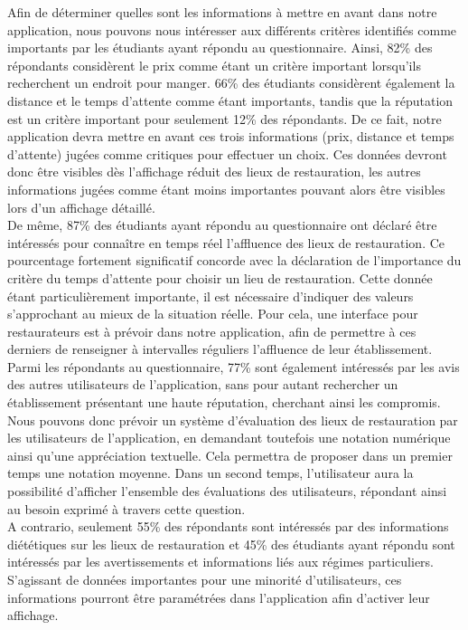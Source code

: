 Afin de déterminer quelles sont les informations à mettre en avant dans notre application, nous pouvons nous intéresser aux différents critères identifiés comme importants par les étudiants ayant répondu au questionnaire. Ainsi, 82\% des répondants considèrent le prix comme étant un critère important lorsqu'ils recherchent un endroit pour manger. 66\% des étudiants considèrent également la distance et le temps d'attente comme étant importants, tandis que la réputation est un critère important pour seulement 12\% des répondants. De ce fait, notre application devra mettre en avant ces trois informations (prix, distance et temps d'attente) jugées comme critiques pour effectuer un choix. Ces données devront donc être visibles dès l'affichage réduit des lieux de restauration, les autres informations jugées comme étant moins importantes pouvant alors être visibles lors d’un affichage détaillé. \\

De même, 87\% des étudiants ayant répondu au questionnaire ont déclaré être intéressés pour connaître en temps réel l'affluence des lieux de restauration. Ce pourcentage fortement significatif concorde avec la déclaration de l'importance du critère du temps d'attente pour choisir un lieu de restauration. Cette donnée étant particulièrement importante, il est nécessaire d'indiquer des valeurs s'approchant au mieux de la situation réelle. Pour cela, une interface pour restaurateurs est à prévoir dans notre application, afin de permettre à ces derniers de renseigner à intervalles réguliers l’affluence de leur établissement. \\

Parmi les répondants au questionnaire, 77\% sont également intéressés par les avis des autres utilisateurs de l'application, sans pour autant rechercher un établissement présentant une haute réputation, cherchant ainsi les compromis. Nous pouvons donc prévoir un système d’évaluation des lieux de restauration par les utilisateurs de l'application, en demandant toutefois une notation numérique ainsi qu’une appréciation textuelle. Cela permettra de proposer dans un premier temps une notation moyenne. Dans un second temps, l'utilisateur aura la possibilité d'afficher l’ensemble des évaluations des utilisateurs, répondant ainsi au besoin exprimé à travers cette question. \\

A contrario, seulement 55\% des répondants sont intéressés par des informations diététiques sur les lieux de restauration et 45\% des étudiants ayant répondu sont intéressés par les avertissements et informations liés aux régimes particuliers. S'agissant de données importantes pour une minorité d'utilisateurs, ces informations pourront être paramétrées dans l'application afin d'activer leur affichage. \\

